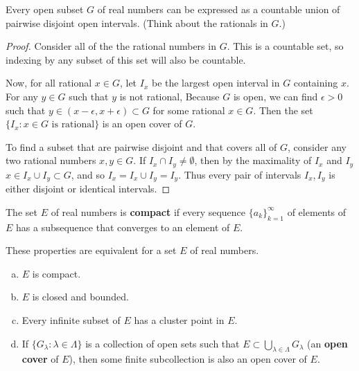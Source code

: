 \begin{pblm}%
	Every open subset $G$ of real numbers can be expressed as a countable union 
	of pairwise disjoint open intervals. (Think about the rationals in $G$.)
\begin{proof}
Consider all of the the rational numbers in $G$. This is a countable set, so 
indexing by any subset of this set will also be countable. 

Now, for all rational $x \in G$, let $I_x$ be the largest open interval in $G$ containing 
$x$. For any $y \in G$ such that $y$ is not rational, Because $G$ is open, we can find 
$\epsilon > 0$ such that $y \in (x - \epsilon, x + \epsilon)\subset G$ for some rational 
$x \in G$. Then the set $\{I_x : x \in G \text{ is rational} \}$ is an open cover of $G$. 

To find a subset that are pairwise disjoint and that covers all of $G$, consider any two 
rational numbers $x, y \in G$. If $I_x \cap I_y \neq \emptyset$, then by the maximality 
of $I_x$ and $I_y$ $x \in I_x \cup I_y \subset G$, and so $I_x = I_x \cup I_y = I_y$. 
Thus every pair of intervals
$I_x, I_y$ is either disjoint or identical intervals. 
\end{proof}
\end{pblm}

\begin{defn}\label{d:compact}%
	The set $E$ of real numbers is \textbf{compact} if every sequence 
	$\{a_k\}_{k=1}^\infty$ of elements of $E$ has a subsequence that converges 
	to an element of $E$. 
\end{defn}

\begin{fact}%
	These properties are equivalent for a set $E$ of real numbers. 
	\begin{enumerate}[(a)]
		\item $E$ is compact. 
		\item $E$ is closed and bounded. 
		\item Every infinite subset of $E$ has a cluster point in $E$. 
		\item If $\{G_\lambda: \lambda \in \Lambda\}$ is a collection of open 
		sets such that $E \subset \bigcup\limits_{\lambda \in \Lambda}G_\lambda$ 
		(an \textbf{open cover} of $E$), then some finite subcollection is 
		also an open cover of $E$.
	\end{enumerate}
\end{fact}



